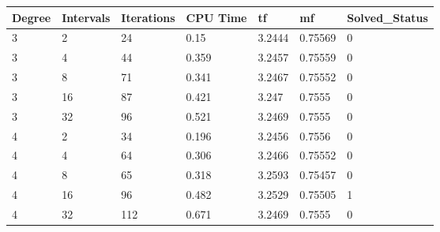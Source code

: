 \begin{tabular}{lllllll}
Degree & Intervals & Iterations & CPU Time & tf & mf & Solved_Status \\ 
\hline 
3 & 2 & 24 & 0.15 & 3.2444 & 0.75569 & 0 \\ 
3 & 4 & 44 & 0.359 & 3.2457 & 0.75559 & 0 \\ 
3 & 8 & 71 & 0.341 & 3.2467 & 0.75552 & 0 \\ 
3 & 16 & 87 & 0.421 & 3.247 & 0.7555 & 0 \\ 
3 & 32 & 96 & 0.521 & 3.2469 & 0.7555 & 0 \\ 
4 & 2 & 34 & 0.196 & 3.2456 & 0.7556 & 0 \\ 
4 & 4 & 64 & 0.306 & 3.2466 & 0.75552 & 0 \\ 
4 & 8 & 65 & 0.318 & 3.2593 & 0.75457 & 0 \\ 
4 & 16 & 96 & 0.482 & 3.2529 & 0.75505 & 1 \\ 
4 & 32 & 112 & 0.671 & 3.2469 & 0.7555 & 0 \\ 
\hline 
\end{tabular}